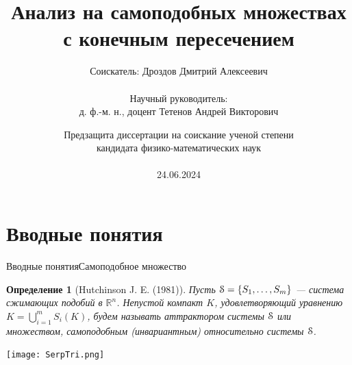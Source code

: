 \documentclass[aspectratio=1610, 10pt, notheorems]{beamer}
\title[ ]
    {Анализ на самоподобных множествах с конечным пересечением}
\author[ ]
    {Соискатель: Дроздов Дмитрий Алексеевич\\ \; \\
    Научный руководитель:\\ 
    д. ф.-м. н., доцент Тетенов Андрей Викторович}
\institute[ИМ СО РАН]{Институт математики имени С. Л. Соболева СО РАН, Новосибирск}
\date[10.06.2024]
    {Предзащита диссертации на соискание ученой степени\\ кандидата физико-математических наук\\ \; \\
    24.06.2024}
\newtheorem{definition}  {Определение}
\begin{document}
\begin{frame}{}
    \titlepage
\end{frame}



\section{Вводные понятия} %


\begin{frame}{Вводные понятия}{Самоподобное множество}
    \begin{definition}[Hutchinson J. E. (1981)]
        Пусть ${\EuScript S}=\{S_1, \ldots, S_m\}$ --- система сжимающих подобий в $\mathbb{R}^n$.  
        Непустой компакт $K$, удовлетворяющий уравнению  $K=\bigcup\limits_{i=1}^m S_i(K)$, будем называть {\em аттрактором системы} ${\EuScript S}$ или множеством, самоподобным (инвариантным) относительно системы ${\EuScript S}$.
    \end{definition}
    \begin{center}
    \texttt{[image: SerpTri.png]}
    \end{center}
\end{frame}
\end{document}
